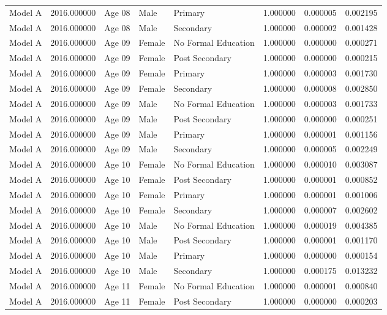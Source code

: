 \begin{table}[ht]
\begin{tabular}{lrlllrrr}
Model A & 2016.000000 & Age 08 & Male & Primary & 1.000000 & 0.000005 & 0.002195 \\
Model A & 2016.000000 & Age 08 & Male & Secondary & 1.000000 & 0.000002 & 0.001428 \\
Model A & 2016.000000 & Age 09 & Female & No Formal Education & 1.000000 & 0.000000 & 0.000271 \\
Model A & 2016.000000 & Age 09 & Female & Post Secondary & 1.000000 & 0.000000 & 0.000215 \\
Model A & 2016.000000 & Age 09 & Female & Primary & 1.000000 & 0.000003 & 0.001730 \\
Model A & 2016.000000 & Age 09 & Female & Secondary & 1.000000 & 0.000008 & 0.002850 \\
Model A & 2016.000000 & Age 09 & Male & No Formal Education & 1.000000 & 0.000003 & 0.001733 \\
Model A & 2016.000000 & Age 09 & Male & Post Secondary & 1.000000 & 0.000000 & 0.000251 \\
Model A & 2016.000000 & Age 09 & Male & Primary & 1.000000 & 0.000001 & 0.001156 \\
Model A & 2016.000000 & Age 09 & Male & Secondary & 1.000000 & 0.000005 & 0.002249 \\
Model A & 2016.000000 & Age 10 & Female & No Formal Education & 1.000000 & 0.000010 & 0.003087 \\
Model A & 2016.000000 & Age 10 & Female & Post Secondary & 1.000000 & 0.000001 & 0.000852 \\
Model A & 2016.000000 & Age 10 & Female & Primary & 1.000000 & 0.000001 & 0.001006 \\
Model A & 2016.000000 & Age 10 & Female & Secondary & 1.000000 & 0.000007 & 0.002602 \\
Model A & 2016.000000 & Age 10 & Male & No Formal Education & 1.000000 & 0.000019 & 0.004385 \\
Model A & 2016.000000 & Age 10 & Male & Post Secondary & 1.000000 & 0.000001 & 0.001170 \\
Model A & 2016.000000 & Age 10 & Male & Primary & 1.000000 & 0.000000 & 0.000154 \\
Model A & 2016.000000 & Age 10 & Male & Secondary & 1.000000 & 0.000175 & 0.013232 \\
Model A & 2016.000000 & Age 11 & Female & No Formal Education & 1.000000 & 0.000001 & 0.000840 \\
Model A & 2016.000000 & Age 11 & Female & Post Secondary & 1.000000 & 0.000000 & 0.000203 \\

\end{tabular}
\end{table}
